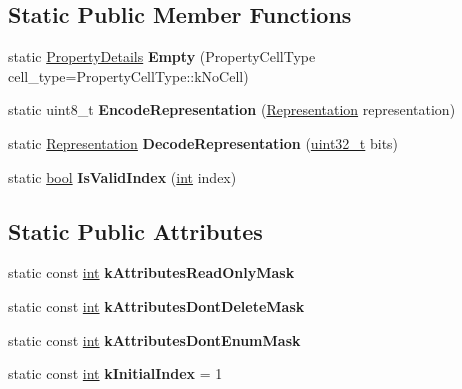 \subsection*{Static Public Member Functions}
\begin{DoxyCompactItemize}
\item 
\mbox{\label{classv8_1_1internal_1_1PropertyDetails_a378750fba5d3432f2afbb0c0683096ae}} 
static \mbox{\hyperlink{classv8_1_1internal_1_1PropertyDetails}{Property\+Details}} {\bfseries Empty} (Property\+Cell\+Type cell\+\_\+type=Property\+Cell\+Type\+::k\+No\+Cell)
\item 
\mbox{\label{classv8_1_1internal_1_1PropertyDetails_aba5d8cbae5e913ab4eb3b2349a220c20}} 
static uint8\+\_\+t {\bfseries Encode\+Representation} (\mbox{\hyperlink{classv8_1_1internal_1_1Representation}{Representation}} representation)
\item 
\mbox{\label{classv8_1_1internal_1_1PropertyDetails_ac46e9f823025517f697c92b65c8303d1}} 
static \mbox{\hyperlink{classv8_1_1internal_1_1Representation}{Representation}} {\bfseries Decode\+Representation} (\mbox{\hyperlink{classuint32__t}{uint32\+\_\+t}} bits)
\item 
\mbox{\label{classv8_1_1internal_1_1PropertyDetails_a8d2b4f5f20af6dc0d8f1327f3167134c}} 
static \mbox{\hyperlink{classbool}{bool}} {\bfseries Is\+Valid\+Index} (\mbox{\hyperlink{classint}{int}} index)
\end{DoxyCompactItemize}
\subsection*{Static Public Attributes}
\begin{DoxyCompactItemize}
\item 
static const \mbox{\hyperlink{classint}{int}} {\bfseries k\+Attributes\+Read\+Only\+Mask}
\item 
static const \mbox{\hyperlink{classint}{int}} {\bfseries k\+Attributes\+Dont\+Delete\+Mask}
\item 
static const \mbox{\hyperlink{classint}{int}} {\bfseries k\+Attributes\+Dont\+Enum\+Mask}
\item 
\mbox{\label{classv8_1_1internal_1_1PropertyDetails_a772f09c4b200155e67c8412048bc104d}} 
static const \mbox{\hyperlink{classint}{int}} {\bfseries k\+Initial\+Index} = 1
\end{DoxyCompactItemize}


